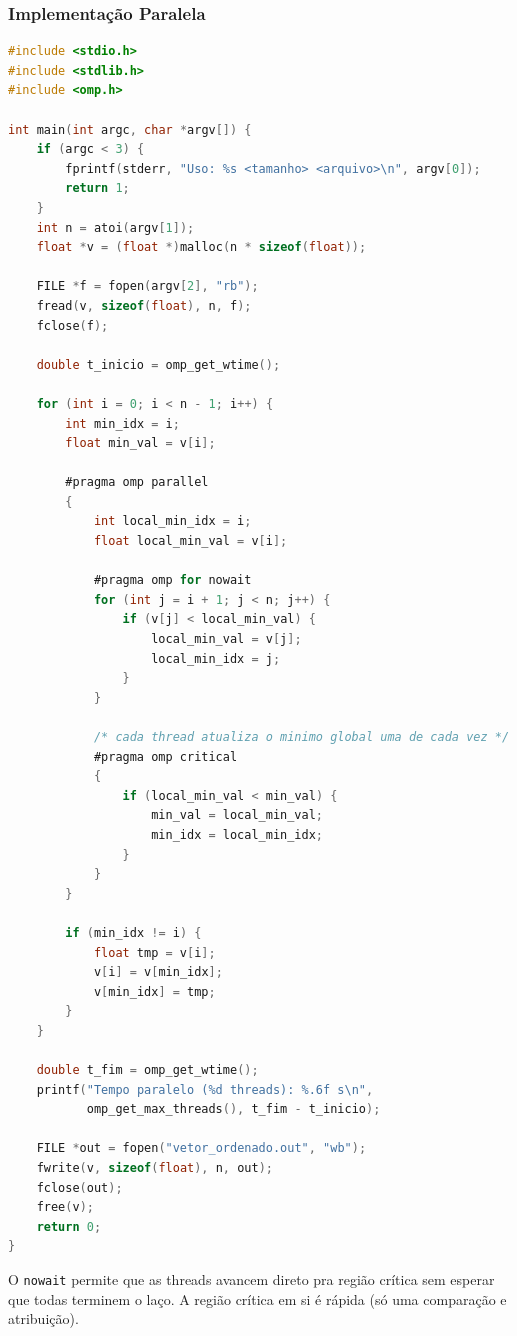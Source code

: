 \documentclass[12pt]{article}
\begin{document}
\subsubsection{Implementação Paralela}

\begin{lstlisting}[language=C, caption={Selection Sort paralelo}]
#include <stdio.h>
#include <stdlib.h>
#include <omp.h>

int main(int argc, char *argv[]) {
    if (argc < 3) {
        fprintf(stderr, "Uso: %s <tamanho> <arquivo>\n", argv[0]);
        return 1;
    }
    int n = atoi(argv[1]);
    float *v = (float *)malloc(n * sizeof(float));

    FILE *f = fopen(argv[2], "rb");
    fread(v, sizeof(float), n, f);
    fclose(f);

    double t_inicio = omp_get_wtime();

    for (int i = 0; i < n - 1; i++) {
        int min_idx = i;
        float min_val = v[i];

        #pragma omp parallel
        {
            int local_min_idx = i;
            float local_min_val = v[i];

            #pragma omp for nowait
            for (int j = i + 1; j < n; j++) {
                if (v[j] < local_min_val) {
                    local_min_val = v[j];
                    local_min_idx = j;
                }
            }

            /* cada thread atualiza o minimo global uma de cada vez */
            #pragma omp critical
            {
                if (local_min_val < min_val) {
                    min_val = local_min_val;
                    min_idx = local_min_idx;
                }
            }
        }

        if (min_idx != i) {
            float tmp = v[i];
            v[i] = v[min_idx];
            v[min_idx] = tmp;
        }
    }

    double t_fim = omp_get_wtime();
    printf("Tempo paralelo (%d threads): %.6f s\n",
           omp_get_max_threads(), t_fim - t_inicio);

    FILE *out = fopen("vetor_ordenado.out", "wb");
    fwrite(v, sizeof(float), n, out);
    fclose(out);
    free(v);
    return 0;
}
\end{lstlisting}

O \texttt{nowait} permite que as threads avancem direto pra região crítica sem esperar que todas terminem o laço. A região crítica em si é rápida (só uma comparação e atribuição).
\end{document}
